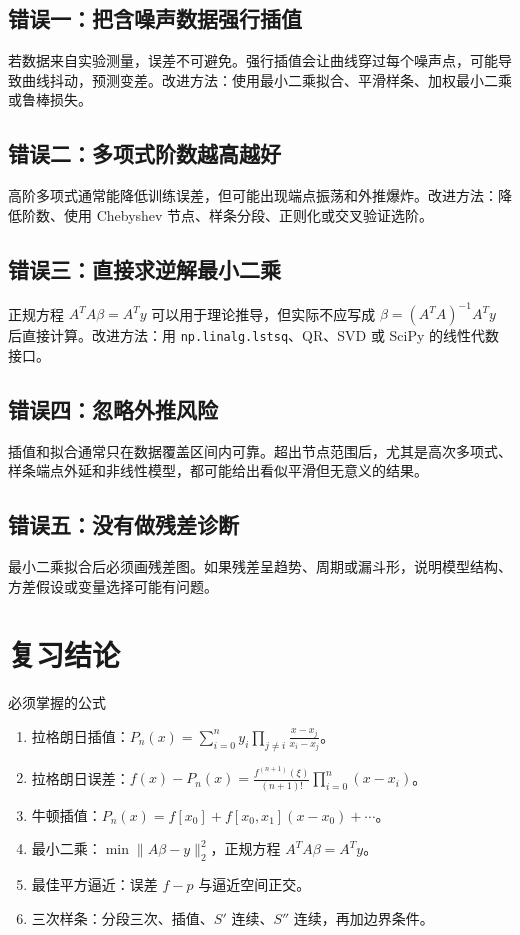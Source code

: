 \documentclass[11pt,a4paper]{ctexart}
\begin{document}
\subsection{错误一：把含噪声数据强行插值}

若数据来自实验测量，误差不可避免。强行插值会让曲线穿过每个噪声点，可能导致曲线抖动，预测变差。改进方法：使用最小二乘拟合、平滑样条、加权最小二乘或鲁棒损失。

\subsection{错误二：多项式阶数越高越好}

高阶多项式通常能降低训练误差，但可能出现端点振荡和外推爆炸。改进方法：降低阶数、使用 Chebyshev 节点、样条分段、正则化或交叉验证选阶。

\subsection{错误三：直接求逆解最小二乘}

正规方程 $A^TA\beta=A^Ty$ 可以用于理论推导，但实际不应写成 $\beta=(A^TA)^{-1}A^Ty$ 后直接计算。改进方法：用 \verb|np.linalg.lstsq|、QR、SVD 或 SciPy 的线性代数接口。

\subsection{错误四：忽略外推风险}

插值和拟合通常只在数据覆盖区间内可靠。超出节点范围后，尤其是高次多项式、样条端点外延和非线性模型，都可能给出看似平滑但无意义的结果。

\subsection{错误五：没有做残差诊断}

最小二乘拟合后必须画残差图。如果残差呈趋势、周期或漏斗形，说明模型结构、方差假设或变量选择可能有问题。

\newpage
\section{复习结论}

\begin{keybox}{必须掌握的公式}
\begin{enumerate}[label=\arabic*)]
  \item 拉格朗日插值：$P_n(x)=\sum_{i=0}^ny_i\prod_{j\ne i}\frac{x-x_j}{x_i-x_j}$。
  \item 拉格朗日误差：$f(x)-P_n(x)=\frac{f^{(n+1)}(\xi)}{(n+1)!}\prod_{i=0}^n(x-x_i)$。
  \item 牛顿插值：$P_n(x)=f[x_0]+f[x_0,x_1](x-x_0)+\cdots$。
  \item 最小二乘：$\min\|A\beta-y\|_2^2$，正规方程 $A^TA\beta=A^Ty$。
  \item 最佳平方逼近：误差 $f-p$ 与逼近空间正交。
  \item 三次样条：分段三次、插值、$S'$ 连续、$S''$ 连续，再加边界条件。
\end{enumerate}
\end{keybox}
\end{document}
